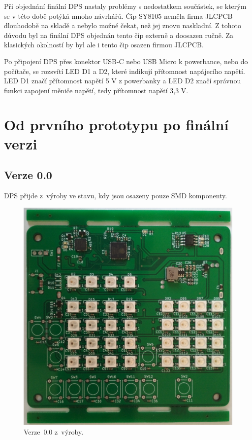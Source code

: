   Při objednání finální DPS nastaly problémy s nedostatkem součástek, se kterým se v této době potýká mnoho návrhářů. Čip SY8105 neměla %
  firma JLCPCB dlouhodobě na skladě a nebylo možné čekat, než jej znovu naskladní. Z tohoto důvodu byl na finální DPS objednán tento čip 
  externě a doosazen ručně. Za klasických okolností by byl ale i tento čip osazen firmou JLCPCB.

  Po připojení DPS přes konektor USB-C nebo USB Micro k powerbance, nebo do počítače, se rozsvítí LED D1 a D2, které indikují přítomnost 
  napájecího napětí. LED D1 značí přítomnost napětí 5 V z powerbanky a LED D2 značí správnou funkci zapojení měniče napětí, tedy přítomnost 
  napětí 3,3 V.

  \chapter{Od prvního prototypu po finální verzi} %
  \section{Verze 0.0}
  DPS přijde z~výroby ve stavu, kdy jsou osazeny pouze SMD komponenty.

  \begin{figure}[!h]
    \begin{center}
      \includegraphics[scale=0.1]{obrazky/Verze0_vyroba_kolejnice.jpg}
    \end{center}
    \caption[Verze~0.0 z~výroby]{Verze~0.0 z~výroby.}
  \end{figure}

